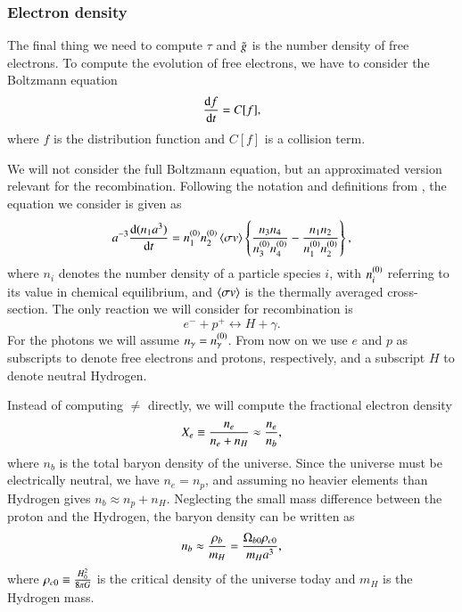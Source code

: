 \subsubsection{Electron density} \label{sssec:M2_electron_density}
The final thing we need to compute $\tau$ and $\g$ is the number density of free electrons. To compute the evolution of free electrons, we have to consider the Boltzmann equation \citep[Eq. (3.19)]{Dodelson}
\begin{equation} \label{eq:M2:theory:Boltzmann_equation}
    \dv{f}{t} = C[f],
\end{equation}
where $f$ is the distribution function and $C[f]$ is a collision term. 

We will not consider the full Boltzmann equation, but an approximated version relevant for the recombination. Following the notation and definitions from \cite[Eq. (4.5)-(4.9)]{Dodelson}, the equation we consider is given as  
\begin{equation} \label{eq:M2:theory:Boltzmann_equation_four_particles_scale_factor}
    a^{-3}\dv{(n_1 a^3)}{t} = \equilibriumn[1] \equilibriumn[2] \expval{\sigma v} \BBclosed{\frac{n_3 n_4}{\equilibriumn[3] \equilibriumn[4]} - \frac{n_1 n_2}{\equilibriumn[1] \equilibriumn[2]}},
\end{equation}
where $n_i$ denotes the number density of a particle species $i$, with $\equilibriumn[i]$ referring to its value in chemical equilibrium, and $\expval{\sigma v}$ is the thermally averaged cross-section. The only reaction we will consider for recombination is   
\begin{equation} \label{eq:M2:theory:electron_proton_to_hydrogen_photon}
    e^- + p^+ \leftrightarrow H + \gamma.
\end{equation}   
For the photons we will assume $n_\gamma = \equilibriumn[\gamma]$. From now on we use $e$ and $p$ as subscripts to denote free electrons and protons, respectively, and a subscript $H$ to denote neutral Hydrogen. 

Instead of computing $\ne$ directly, we will compute the fractional electron density
\begin{equation} \label{eq:M2:theory:X_e_definition}
    \Xe \equiv \frac{n_e}{n_e + n_H} \approx \frac{\ne}{n_b},
\end{equation}
where $n_b$ is the total baryon density of the universe. Since the universe must be electrically neutral, we have $n_e=n_p$, and assuming no heavier elements than Hydrogen gives $n_b\approx n_p+n_H$. Neglecting the small mass difference between the proton and the Hydrogen, the baryon density can be written as    
\begin{equation} \label{eq:M2:theory:helium_baryon_number_density}
    n_b \approx \frac{\rho_b}{m_H} = \frac{\obn \rhocn}{m_H a^3},
\end{equation}
where $\rhocn\equiv \frac{ H_0^2}{8\pi G}$ is the critical density of the universe today and $m_H$ is the Hydrogen mass. 

